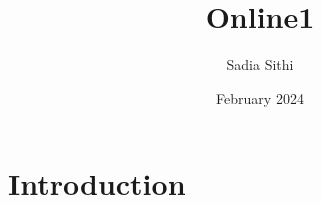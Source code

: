 \documentclass{article}
\title{Online1}
\author{Sadia Sithi}
\date{February 2024}
\begin{document}
\maketitle

\section{Introduction}
\end{document}
